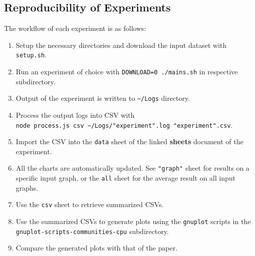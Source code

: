 \subsection{Reproducibility of Experiments}

The workflow of each experiment is as follows:

\begin{enumerate}
\def\labelenumi{\arabic{enumi}.}
\item
  Setup the necessary directories and download the input dataset with \texttt{setup.sh}.
\item
  Run an experiment of choice with \texttt{DOWNLOAD=0\ ./mains.sh} in respective subdirectory.
\item
  Output of the experiment is written to \texttt{\textasciitilde{}/Logs} directory.
\item
  Process the output logs into CSV with \texttt{node\ process.js\ csv\ \textasciitilde{}/Logs/"experiment".log\ "experiment".csv}.
\item
  Import the CSV into the \texttt{data} sheet of the linked \textbf{sheets} document of the experiment.
\item
  All the charts are automatically updated. See \texttt{"graph"} sheet for results on a specific input graph, or the \texttt{all} sheet for the average result on all input graphs.
\item
  Use the \texttt{csv} sheet to retrieve summarized CSVs.
\item
  Use the summarized CSVs to generate plots using the \texttt{gnuplot} scripts in the \texttt{gnuplot-scripts-communities-cpu} subdirectory.
\item
  Compare the generated plots with that of the paper.
\end{enumerate}
